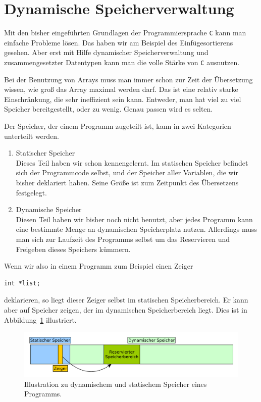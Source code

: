 \section{Dynamische Speicherverwaltung}

Mit den bisher eingeführten Grundlagen der Programmiersprache \texttt{C} kann man einfache Probleme lösen.
Das haben wir am Beispiel des Einfügesortierens gesehen.
Aber erst mit Hilfe dynamischer Speicherverwaltung und zusammengesetzter Datentypen kann man die volle Stärke von \texttt{C} ausnutzen.

Bei der Benutzung von Arrays muss man immer schon zur Zeit der Übersetzung wissen, wie groß das Array maximal werden darf.
Das ist eine relativ starke Einschränkung, die sehr ineffizient sein kann.
Entweder, man hat viel zu viel Speicher bereitgestellt, oder zu wenig.
Genau passen wird es selten.

Der Speicher, der einem Programm zugeteilt ist, kann in zwei Kategorien unterteilt werden.
\begin{enumerate}
\item Statischer Speicher\\
  Dieses Teil haben wir schon kennengelernt. 
  Im statischen Speicher befindet sich der Programmcode selbst, und der Speicher aller Variablen, die wir bisher deklariert haben.
  Seine Größe ist zum Zeitpunkt des Übersetzens festgelegt.

\item Dynamische Speicher\\
  Diesen Teil haben wir bisher noch nicht benutzt, aber jedes Programm kann eine bestimmte Menge an dynamischen Speicherplatz nutzen. 
  Allerdings muss man sich zur Laufzeit des Programms selbst um das Reservieren und Freigeben dieses Speichers kümmern.
\end{enumerate}

Wenn wir also in einem Programm zum Beispiel einen Zeiger
\begin{lstlisting}
int *list;
\end{lstlisting}
deklarieren, so liegt dieser Zeiger selbst im statischen Speicherbereich.
Er kann aber auf Speicher zeigen, der im dynamischen Speicherbereich liegt.
Dies ist in Abbildung~\ref{fig:abmem} illustriert.

\begin{figure}[!ht]
\includegraphics[width=\textwidth]{graphics/zeiger_auf_dynamischen_speicher}
\caption{\label{fig:abmem} Illustration zu dynamischem und statischem Speicher eines Programms.}
\end{figure}

